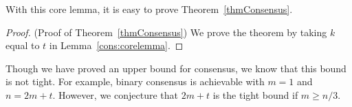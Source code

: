With this core lemma, it is easy to prove Theorem~\ref{thmConsensus}.
\begin{proof}{(Proof of Theorem~\ref{thmConsensus})}
We prove the theorem by taking $k$ equal to $t$ in Lemma~\ref{cons:corelemma}.
\end{proof}

\begin{remark}
Though we have proved an upper bound for consensus, we know that this bound is not tight. 
For example, binary consensus is achievable with $m=1$ and $n=2m+t$. 
However, we conjecture that $2m+t$ is the tight bound if $m \geqslant n/3$.
\end{remark}
